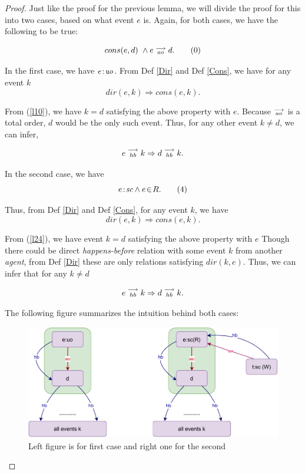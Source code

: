 \begin{proof}
    
    Just like the proof for the previous lemma, we will divide the proof for this into two cases, based on what event $e$ is. Again, for both cases, we have the following to be true:
    
    \[
        cons(e,d) \ \wedge e\stackrel{\longrightarrow}{_{ao}}d.
        \tag{0}
        \label{l20}
    \]

   In the first case, we have $e\!:\!\textit{uo}$. From Def \ref{Dir} and Def \ref{Cons}, we have for any event $k$
   \[
        dir(e,k) \Rightarrow cons(e,k).
   \]
   
   From (\ref{l10}), we have $k=d$ satisfying the above property with $e$. 
   Because $\stackrel{\longrightarrow}{_{ao}}$ is a total order, $d$ would be the only such event. 
   Thus, for any other event $k \neq d$, we can infer,
   
   \[
        e\stackrel{\longrightarrow}{_{hb}}k \Rightarrow d\stackrel{\longrightarrow}{_{hb}}k.
   \]
   
    In the second case, we have 
    \[
        e\!:\!\textit{sc} \wedge e\!\in\!R.
        \tag{4}
        \label{l24}
    \]
    
    Thus, from Def \ref{Dir} and Def \ref{Cons}, for any event $k$, we have 
    \[
        dir(e,k) \Rightarrow cons(e,k).
    \]
    
    From (\ref{l24}), we have event $k=d$ satisfying the above property with $e$  
    Though there could be direct \textit{happens-before} relation with some event $k$ from another \textit{agent}, from Def \ref{Dir} these are only relations satisfying $dir(k,e)$. Thus, we can infer that for any $k \neq d$ 
    
    \[
        e\stackrel{\longrightarrow}{_{hb}}k \Rightarrow d\stackrel{\longrightarrow}{_{hb}}k.
    \]
    
    The following figure summarizes the intuition behind both cases: 
    
    \begin{figure}[H]
        \centering
        \includegraphics[scale=0.7]{5.InstructionReordering/3.Lemmas/Lemma2.pdf}
        \caption{Left figure is for first case and right one for the second}
        \label{fig:my_label}
    \end{figure}

\end{proof}

